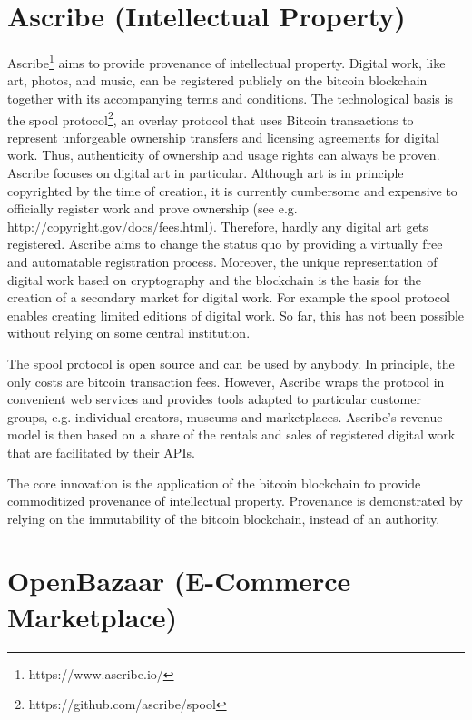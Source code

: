 \section{Ascribe (Intellectual Property)}
\label{sec:ecoascribe}

Ascribe\footnote{https://www.ascribe.io/} aims to provide provenance of intellectual property. Digital work, 
like art, photos, and music, can be registered publicly on the bitcoin blockchain 
together with its accompanying terms and conditions. The technological basis is 
the spool protocol\footnote{https://github.com/ascribe/spool}, an overlay protocol that uses 
Bitcoin transactions to represent unforgeable ownership transfers and licensing 
agreements for digital work. Thus, authenticity of ownership and usage rights can 
always be proven. Ascribe focuses on digital art in particular. Although art is 
in principle copyrighted by the time of creation, it is currently cumbersome and 
expensive to officially register work and prove ownership (see e.g. http://copyright.gov/docs/fees.html). 
Therefore, hardly any digital art gets registered. Ascribe aims to change the status 
quo by providing a virtually free and automatable registration process. Moreover, 
the unique representation of digital work based on cryptography and the blockchain 
is the basis for the creation of a secondary market for digital work. For example 
the spool protocol enables creating limited editions of digital work. So far, this 
has not been possible without relying on some central institution.

The spool protocol is open source and can be used by anybody. In principle, the 
only costs are bitcoin transaction fees. However, Ascribe wraps the protocol in 
convenient web services and provides tools adapted to particular customer groups, 
e.g. individual creators, museums and marketplaces. Ascribe's revenue model is 
then based on a share of the rentals and sales of registered digital work that 
are facilitated by their APIs.

The core innovation is the application of the bitcoin blockchain to provide commoditized 
provenance of intellectual property. Provenance is demonstrated by relying on the 
immutability of the bitcoin blockchain, instead of an authority. 

\section{OpenBazaar (E-Commerce Marketplace)}
\label{sec:ecobazaar}

